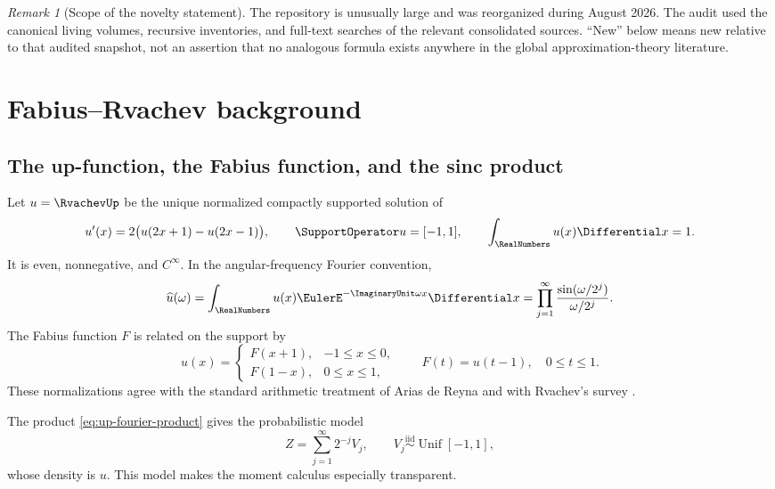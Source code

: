 \documentclass[11pt,oneside]{article}
\theoremstyle{definition}
\theoremstyle{remark}
\newtheorem{remark}[theorem]{Remark}
\begin{document}
\begin{remark}[Scope of the novelty statement]
The repository is unusually large and was reorganized during August 2026.
The audit used the canonical living volumes, recursive inventories, and
full-text searches of the relevant consolidated sources.  ``New'' below
means new relative to that audited snapshot, not an assertion that no
analogous formula exists anywhere in the global approximation-theory
literature.
\end{remark}

\section{Fabius--Rvachev background}

\subsection{The up-function, the Fabius function, and the sinc product}
Let $u=\RvachevUp$ be the unique normalized compactly supported solution of
\begin{equation}
 u'(x)=2\bigl(u(2x+1)-u(2x-1)\bigr),
 \qquad \SupportOperator u=[-1,1],
 \qquad \int_{\RealNumbers}u(x)\Differential x=1.
 \label{eq:up-fde}
\end{equation}
It is even, nonnegative, and $C^\infty$.  In the angular-frequency Fourier
convention,
\begin{equation}
 \widehat u(\omega)
 =\int_{\RealNumbers}u(x)\EulerE^{-\ImaginaryUnit\omega x}\Differential x
 =\prod_{j=1}^{\infty}
   \frac{\sin(\omega/2^j)}{\omega/2^j}.
 \label{eq:up-fourier-product}
\end{equation}
The Fabius function $F$ is related on the support by
\begin{equation}
 u(x)=
 \begin{cases}
  F(x+1),&-1\le x\le0,\\
  F(1-x),&0\le x\le1,
 \end{cases}
 \qquad
 F(t)=u(t-1),\quad0\le t\le1.
 \label{eq:F-up-relation}
\end{equation}
These normalizations agree with the standard arithmetic treatment of Arias
de Reyna and with Rvachev's survey \cite{Arias2018,Rvachev1990}.

The product \eqref{eq:up-fourier-product} gives the probabilistic model
\begin{equation}
 Z=\sum_{j=1}^{\infty}2^{-j}V_j,
 \qquad V_j\stackrel{\mathrm{iid}}{\sim}\operatorname{Unif}[-1,1],
 \label{eq:random-series}
\end{equation}
whose density is $u$.  This model makes the moment calculus especially
transparent.
\end{document}
